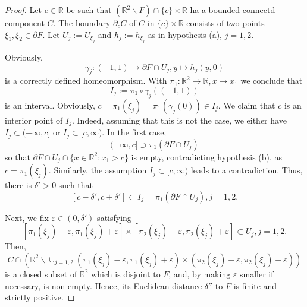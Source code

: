 \documentclass[10pt,leqno]{amsart}
\theoremstyle{definition}
\newcommand{\R}{\mathbb R}
\begin{document}
\begin{proof}
	Let $c\in \R$ be such that $(\R^2\backslash F)\cap\{c\}\times\R$ ha a bounded connectd component $C$. The boundary $\partial_c C$ of $C$ in $\{c\}\times\R$ consists of two points $\xi_1,\xi_2\in\partial F$. Let $U_j:=U_{\xi_j}$ and $h_j:=h_{\xi_j}$ as in hypothesis (a), $j=1,2$.
	
	Obviously,
	$$\gamma_j\colon (-1,1)\rightarrow \partial F\cap U_j, y\mapsto h_j(y,0)$$
	is a correctly defined homeomorphism. With $\pi_1\colon\R^2\rightarrow \R, x\mapsto x_1$ we conclude that
	$$I_j:=\pi_1\circ \gamma_j\left((-1,1)\right)$$
	is an interval. Obviously, $c=\pi_1(\xi_j)=\pi_1(\gamma_j(0))\in I_j$. We claim that $c$ is an interior point of $I_j$. Indeed, assuming that this is not the case, we either have $I_j\subset(-\infty,c]$ or $I_j\subset[c,\infty)$. In the first case,
	$$(-\infty,c]\supset \pi_1(\partial F\cap U_j)$$
	so that $\partial F\cap U_j\cap \{x\in\R^2\colon x_1>c\}$ is empty, contradicting hypothesis (b), as $c=\pi_1(\xi_j)$. Similarly, the assumption $I_j\subset[c,\infty)$ leads to a contradiction. Thus, there is $\delta'>0$ such that
	$$[c-\delta', c+\delta']\subset I_j=\pi_1\left(\partial F\cap U_j\right), j=1,2.$$
	
	Next, we fix $\varepsilon\in (0,\delta')$ satisfying $$[\pi_1(\xi_j)-\varepsilon,\pi_1(\xi_j)+\varepsilon]\times[\pi_2(\xi_j)-\varepsilon,\pi_2(\xi_j)+\varepsilon]\subset U_j, j=1,2.$$
	Then,
	$$C\cap \left(\R^2\backslash\cup_{j=1,2}(\pi_1(\xi_j)-\varepsilon,\pi_1(\xi_j)+\varepsilon)\times(\pi_2(\xi_j)-\varepsilon,\pi_2(\xi_j)+\varepsilon)\right)$$
	is a closed subset of $\R^2$ which is disjoint to $F$, and, by making $\varepsilon$ smaller if necessary, is non-empty. Hence, its Euclidean distance $\delta''$ to $F$ is finite and strictly positive. 
	

\end{proof}
\end{document}
